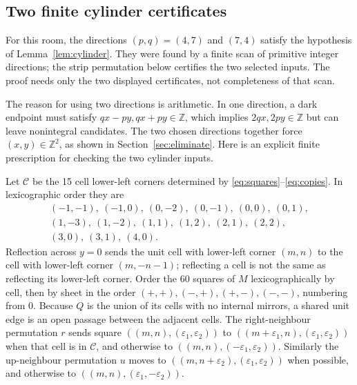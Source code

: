 \documentclass[11pt]{article}
\theoremstyle{remark}
\begin{document}
\subsection{Two finite cylinder certificates}\label{sec:certificate}
For this room, the directions $(p,q)=(4,7)$ and $(7,4)$ satisfy the hypothesis
of Lemma~\ref{lem:cylinder}. They were found by a finite scan of primitive integer directions; the strip permutation below certifies the two selected inputs. The proof needs only the two displayed certificates, not completeness of that scan.

The reason for using two directions is arithmetic. In one direction, a dark endpoint must satisfy $qx-py,qx+py\in\mathbb Z$, which implies $2qx,2py\in\mathbb Z$ but can leave nonintegral candidates. The two chosen directions together force $(x,y)\in\mathbb Z^2$, as shown in Section~\ref{sec:eliminate}. Here is an explicit finite prescription for checking the two cylinder inputs.

Let $\mathcal C$ be the 15 cell lower-left corners determined by
\eqref{eq:squares}--\eqref{eq:copies}. In lexicographic order they are
\[
\begin{gathered}
(-1,-1),\ (-1,0),\ (0,-2),\ (0,-1),\ (0,0),\ (0,1),\\
(1,-3),\ (1,-2),\ (1,1),\ (1,2),\ (2,1),\ (2,2),\\
(3,0),\ (3,1),\ (4,0).
\end{gathered}
\]
Reflection across $y=0$ sends the unit cell with lower-left corner $(m,n)$
to the cell with lower-left corner $(m,-n-1)$; reflecting a cell is not the
same as reflecting its lower-left corner.
Order the 60 squares of $M$ lexicographically by cell, then by sheet in the order
$(+,+),(-,+),(+,-),(-,-)$, numbering from 0.
Because $Q$ is the union of its cells with no internal mirrors, a shared
unit edge is an open passage between the adjacent cells.
The right-neighbour permutation $r$ sends square $((m,n),(\varepsilon_1,\varepsilon_2))$ to
$((m+\varepsilon_1,n),(\varepsilon_1,\varepsilon_2))$ when that cell is in $\mathcal C$, and otherwise to
$((m,n),(-\varepsilon_1,\varepsilon_2))$. Similarly the up-neighbour permutation $u$ moves to
$((m,n+\varepsilon_2),(\varepsilon_1,\varepsilon_2))$ when possible, and otherwise to
$((m,n),(\varepsilon_1,-\varepsilon_2))$.
\end{document}
